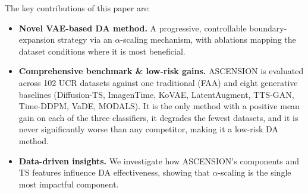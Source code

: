 The key contributions of this paper are:

\begin{itemize}
    \item \textbf{Novel VAE-based DA method.} A progressive,
    controllable boundary-expansion strategy via an
    $\alpha$-scaling mechanism, with ablations mapping the
    dataset conditions where it is most beneficial.

    \item \textbf{Comprehensive benchmark \& low-risk gains.}
    ASCENSION is evaluated across 102 UCR datasets against one
    traditional (FAA) and eight generative baselines
    (Diffusion-TS, ImagenTime, KoVAE, LatentAugment, TTS-GAN,
    Time-DDPM, VaDE, MODALS). It is the only method with a
    positive mean gain on each of the three classifiers, it
    degrades the fewest datasets, and it is never significantly
    worse than any competitor, making it a low-risk DA method.

    \item \textbf{Data-driven insights.} We investigate how
    ASCENSION's components and TS features influence
    DA effectiveness, showing that $\alpha$-scaling is the
    single most impactful component.
\end{itemize}

